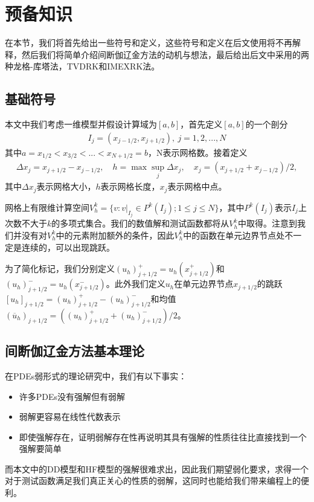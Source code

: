 \cleardoublepage

\section{预备知识}
在本节，我们将首先给出一些符号和定义，这些符号和定义在后文使用将不再解释，然后我们将简单介绍间断伽辽金方法的动机与想法，最后给出后文中采用的两种龙格-库塔法，TVDRK和IMEXRK法。
\subsection{基础符号}
本文中我们考虑一维模型并假设计算域为$[a,b]$，首先定义$[a,b]$的一个剖分
\begin{align*}
    I_{j} = (x_{j-1/2}, x_{j+1/2}), \ j = 1, 2, ..., N
\end{align*}
其中$a=x_{1/2} < x_{3/2}< ...< x_{N+1/2}=b$，N表示网格数。接着定义
\begin{align*}
    \Delta x_j = x_{j+1/2}-x_{j-1/2}, \quad h = \max{\sup_j{\Delta x_j}}, \quad x_j = (x_{j+1/2}+x_{j-1/2})/{2},
\end{align*}
其中$\Delta x_j$表示网格大小，$h$表示网格长度，$x_j$表示网格中点。

网格上有限维计算空间$V_h^k = \{v:v|_{I_j}\in P^k(I_j); 1\leq j\leq N\}$，其中$P^k(I_j)$表示$I_j$上次数不大于$k$的多项式集合。我们的数值解和测试函数都将从$V_h^k$中取得。注意到我们并没有对$V^k_h$中的元素附加额外的条件，因此$V_h^k$中的函数在单元边界节点处不一定是连续的，可以出现跳跃。

为了简化标记，我们分别定义$(u_h)^+_{j+1/2}=u_h(x^+_{j+1/2})$和$(u_h)^-_{j+1/2}=u_h(x^-_{j+1/2})$。此外我们定义$u_h$在单元边界节点$x_{j+1/2}$的跳跃$[u_h]_{j+1/2}=(u_h)^+_{j+1/2}-(u_h)^-_{j+1/2}$和均值$(\overline{u}_h)_{j+1/2}=((u_h)_{j+1/2}^++(u_h)_{j+1/2}^-)/2$。

\subsection{间断伽辽金方法基本理论}

在PDEs弱形式的理论研究中，我们有以下事实\cite{sullivan2020brief}：
\begin{itemize}
    \item 许多PDEs没有强解但有弱解
    \item 弱解更容易在线性代数表示
    \item 即使强解存在，证明弱解存在性再说明其具有强解的性质往往比直接找到一个强解要简单
\end{itemize}
而本文中的DD模型和HF模型的强解很难求出，因此我们期望弱化要求，求得一个对于测试函数满足我们真正关心的性质的弱解，这同时也能给我们带来编程上的便利。

